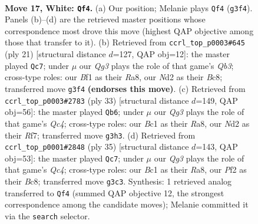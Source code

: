 \documentclass[11pt]{article}
\begin{document}
\clearpage

\begin{figure}[p]\centering
\begin{subfigure}{0.46\textwidth}\centering
\resizebox{\linewidth}{!}{%
\newchessgame
\chessboard[
  setfen={r3k1nr/1pq5/4p3/p1bpPp2/b1Pn2pp/P5Q1/RP1N1PPP/2B1KBNR w Kkq - 0 17},
  showmover=false,
  pgfstyle=straightmove, color=movearrow, markmove={g3-f4}
]}
\caption{}
\end{subfigure}\hfill
\begin{subfigure}{0.46\textwidth}\centering
\resizebox{\linewidth}{!}{%
\newchessgame
\chessboard[
  setfen={rnb2rk1/p3bppp/1q1ppn2/3P4/1pP1P3/3BBN2/1P3PPP/RN1QK2R b KQ - 1 11},
  showmover=false,
  pgfstyle=straightmove, color=movearrow, markmove={b6-c7}
]}
\caption{}
\end{subfigure}
\\[4pt]
\begin{subfigure}{0.46\textwidth}\centering
\resizebox{\linewidth}{!}{%
\newchessgame
\chessboard[
  setfen={r1b3k1/1p1nbrp1/2pp3p/p1qPpp2/2P5/1PB3PN/PQ2PPBP/2RR3K b - - 3 17},
  showmover=false,
  pgfstyle=straightmove, color=movearrow, markmove={c5-b6}
]}
\caption{}
\end{subfigure}\hfill
\begin{subfigure}{0.46\textwidth}\centering
\resizebox{\linewidth}{!}{%
\newchessgame
\chessboard[
  setfen={r1br2k1/p4pb1/Bp1ppnpp/2q1n3/1P1NPB2/Q1P4P/P2N1PP1/3RR1K1 b - - 0 18},
  showmover=false,
  pgfstyle=straightmove, color=movearrow, markmove={c5-c7}
]}
\caption{}
\end{subfigure}
\caption{\textbf{Move 17, White: \texttt{Qf4}.} (a) Our position; Melanie plays \texttt{Qf4} (\texttt{g3f4}). Panels (b)--(d) are the retrieved master positions whose correspondence most drove this move (highest QAP objective among those that transfer to it). (b) Retrieved from \texttt{ccrl\_top\_p0003\#645} (ply 21) [structural distance $d$=127, QAP obj=12]: the master played \texttt{Qc7}; under $\mu$ our \emph{Qg3} plays the role of that game's \emph{Qb3}; cross-type roles: our \emph{B}f1 as their \emph{R}a8, our \emph{N}d2 as their \emph{B}c8; transferred move \texttt{g3f4} \textbf{(endorses this move)}. (c) Retrieved from \texttt{ccrl\_top\_p0003\#2783} (ply 33) [structural distance $d$=149, QAP obj=56]: the master played \texttt{Qb6}; under $\mu$ our \emph{Qg3} plays the role of that game's \emph{Qc4}; cross-type roles: our \emph{B}c1 as their \emph{R}a8, our \emph{N}d2 as their \emph{R}f7; transferred move \texttt{g3h3}. (d) Retrieved from \texttt{ccrl\_top\_p0001\#2848} (ply 35) [structural distance $d$=143, QAP obj=53]: the master played \texttt{Qc7}; under $\mu$ our \emph{Qg3} plays the role of that game's \emph{Qc4}; cross-type roles: our \emph{B}c1 as their \emph{R}a8, our \emph{P}f2 as their \emph{B}c8; transferred move \texttt{g3c3}. Synthesis: 1 retrieved analog transferred to \texttt{Qf4} (summed QAP objective 12, the strongest correspondence among the candidate moves); Melanie committed it via the \texttt{search} selector.}
\label{fig:thought-m32}
\end{figure}
\end{document}
